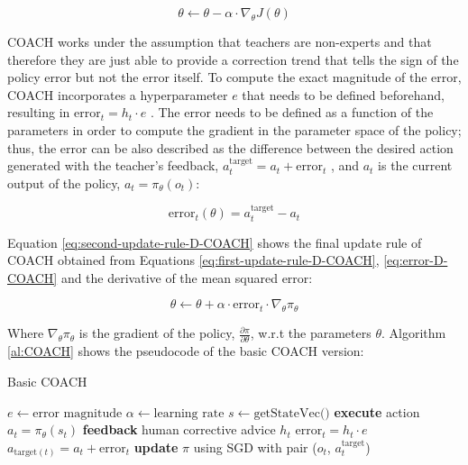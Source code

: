 \begin{equation}
\theta \leftarrow \theta - \alpha \cdot \nabla_\theta J(\theta)
\label{eq:first-update-rule-D-COACH}
\end{equation}

COACH works under the assumption that teachers are non-experts and that therefore they are just able to provide a correction trend that tells the sign of the policy error but not the error itself. To compute the exact magnitude of the error, COACH incorporates a hyperparameter $e$ that needs to be defined beforehand, resulting in $\text{error}_t = h_t \cdot e$  \cite{COACH-Celemin-Ruiz-del-Solar:2015}. The error needs to be defined as a function of the parameters in order to compute the gradient in the parameter space of the policy; thus, the error can be also described as the difference between the desired action generated with the teacher's feedback, $a^\text{target}_t = a_t + \text{error}_t$ , and $a_t$ is the current output of the policy, $a_t = \pi_\theta(o_t)$:


\begin{equation}
\text{error}_t(\theta) = a_t^\text{target} - a_t
\label{eq:error-D-COACH}
\end{equation}


Equation \eqref{eq:second-update-rule-D-COACH} shows the final update rule of COACH obtained from Equations \eqref{eq:first-update-rule-D-COACH}, \eqref{eq:error-D-COACH} and the derivative of the mean squared error:


\begin{equation}
\theta \leftarrow \theta + \alpha \cdot \text{error}_t \cdot \nabla_\theta \pi_\theta
\label{eq:second-update-rule-D-COACH}
\end{equation}



Where $\nabla_\theta \pi_\theta$ is the gradient of the policy, $\frac{\partial \pi}{\partial \theta}$, w.r.t the parameters $\theta$. Algorithm \ref{al:COACH} shows the pseudocode of the basic COACH version:


\begin{algorithm}[H]
\caption{Basic COACH}
\begin{algorithmic}[1]
\State $e \leftarrow \text{error magnitude}$ 
\State $\alpha \leftarrow \text{learning rate}$ 
 {}
\State $s \leftarrow \text{getStateVec()}$
\State \textbf{execute} action $a_{t}=\pi_{\theta}(s_{t})$
\State \textbf{feedback} human corrective advice $h_{t}$
\State $\text{error}_{t} = h_{t}\cdot e$
\State $a_{\text{target}(t)} = a_{t} + \text{error}_{t}$
\State \textbf{update} $\pi$ using SGD with pair ($o_{t}$, $a^{\text{target}}_{t}$)
\EndIf
\EndWhile
\end{algorithmic}
\label{al:COACH}
\end{algorithm}

